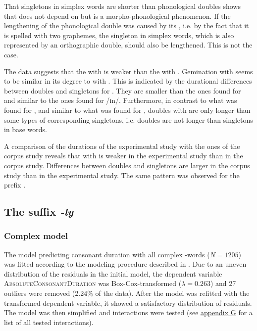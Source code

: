 That singletons in simplex words are shorter than phonological doubles shows that  does not depend on  but is a {morpho-phonological phenomenon}. If the lengthening of the phonological double was caused by its , i.e. by the fact that it is spelled with two graphemes, the singleton in simplex words, which is also represented by an orthographic double, should also be lengthened. This is not the case. 


The data suggests that the  with  is weaker than the  with . Gemination with  seems to be similar in its degree to  with . 
This is indicated by the durational differences between doubles and singletons for . They are smaller than the ones found for  and similar to the ones found for /ɪn/. 
Furthermore, in contrast to what was found for , and similar to what was found for , doubles with  are only longer than some types of corresponding singletons, i.e. doubles are not longer than singletons in base words.



A comparison of the durations of the experimental study with the ones of the corpus study reveals that  with  is weaker in the experimental study than in the corpus study. Differences between doubles and singletons are larger in the corpus study than in the experimental study. The same pattern was observed for the prefix .


\subsection{The suffix \textit{-ly} }

\subsubsection{Complex model}

The model predicting consonant duration with all complex -words ($N=1205$) was fitted according to the modeling procedure described in . Due to an uneven distribution of the residuals in the initial model, the dependent variable \textsc{AbsoluteConsonantDuration} was Box-Cox-transformed ($\lambda = 0.263$) and 27 outliers were removed (2.24\% of the data). 
After the model was refitted with the transformed dependent variable, it showed a satisfactory distribution of residuals. The model was then simplified and interactions were tested (see \hyperref[Appendix G Summaries of tested interactions in experimental study]{appendix G} for a list of all tested interactions). 

